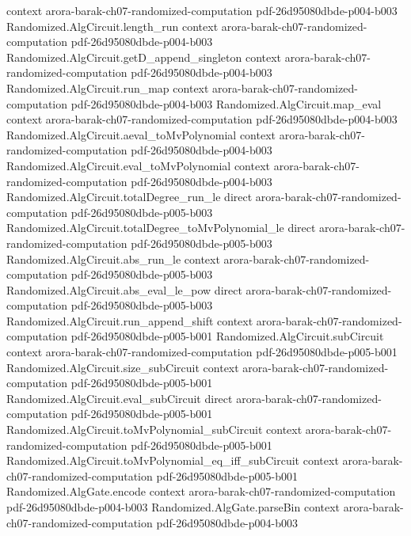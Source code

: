 \begin{theorem}
  {context}
  {arora-barak-ch07-randomized-computation}
  {pdf-26d95080dbde-p004-b003}
\proofstep
  {Randomized.AlgCircuit.length_run}
  {context}
  {arora-barak-ch07-randomized-computation}
  {pdf-26d95080dbde-p004-b003}
\proofstep
  {Randomized.AlgCircuit.getD_append_singleton}
  {context}
  {arora-barak-ch07-randomized-computation}
  {pdf-26d95080dbde-p004-b003}
\proofstep
  {Randomized.AlgCircuit.run_map}
  {context}
  {arora-barak-ch07-randomized-computation}
  {pdf-26d95080dbde-p004-b003}
\proofstep
  {Randomized.AlgCircuit.map_eval}
  {context}
  {arora-barak-ch07-randomized-computation}
  {pdf-26d95080dbde-p004-b003}
\proofstep
  {Randomized.AlgCircuit.aeval_toMvPolynomial}
  {context}
  {arora-barak-ch07-randomized-computation}
  {pdf-26d95080dbde-p004-b003}
\proofstep
  {Randomized.AlgCircuit.eval_toMvPolynomial}
  {context}
  {arora-barak-ch07-randomized-computation}
  {pdf-26d95080dbde-p004-b003}
\proofstep
  {Randomized.AlgCircuit.totalDegree_run_le}
  {direct}
  {arora-barak-ch07-randomized-computation}
  {pdf-26d95080dbde-p005-b003}
\proofstep
  {Randomized.AlgCircuit.totalDegree_toMvPolynomial_le}
  {direct}
  {arora-barak-ch07-randomized-computation}
  {pdf-26d95080dbde-p005-b003}
\proofstep
  {Randomized.AlgCircuit.abs_run_le}
  {context}
  {arora-barak-ch07-randomized-computation}
  {pdf-26d95080dbde-p005-b003}
\proofstep
  {Randomized.AlgCircuit.abs_eval_le_pow}
  {direct}
  {arora-barak-ch07-randomized-computation}
  {pdf-26d95080dbde-p005-b003}
\proofstep
  {Randomized.AlgCircuit.run_append_shift}
  {context}
  {arora-barak-ch07-randomized-computation}
  {pdf-26d95080dbde-p005-b001}
\proofstep
  {Randomized.AlgCircuit.subCircuit}
  {context}
  {arora-barak-ch07-randomized-computation}
  {pdf-26d95080dbde-p005-b001}
\proofstep
  {Randomized.AlgCircuit.size_subCircuit}
  {context}
  {arora-barak-ch07-randomized-computation}
  {pdf-26d95080dbde-p005-b001}
\proofstep
  {Randomized.AlgCircuit.eval_subCircuit}
  {direct}
  {arora-barak-ch07-randomized-computation}
  {pdf-26d95080dbde-p005-b001}
\proofstep
  {Randomized.AlgCircuit.toMvPolynomial_subCircuit}
  {context}
  {arora-barak-ch07-randomized-computation}
  {pdf-26d95080dbde-p005-b001}
\proofstep
  {Randomized.AlgCircuit.toMvPolynomial_eq_iff_subCircuit}
  {context}
  {arora-barak-ch07-randomized-computation}
  {pdf-26d95080dbde-p005-b001}
\proofstep
  {Randomized.AlgGate.encode}
  {context}
  {arora-barak-ch07-randomized-computation}
  {pdf-26d95080dbde-p004-b003}
\proofstep
  {Randomized.AlgGate.parseBin}
  {context}
  {arora-barak-ch07-randomized-computation}
  {pdf-26d95080dbde-p004-b003}

\end{theorem}
